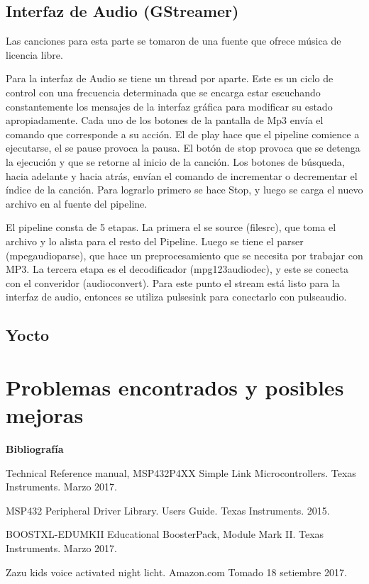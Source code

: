 \subsection{Interfaz de Audio (GStreamer)}
\label{sec:gstramer}
Las canciones para esta parte se tomaron de una fuente que ofrece música de licencia libre. %


Para la interfaz de Audio se tiene un thread por aparte. Este es un ciclo de control con una
frecuencia determinada que se encarga estar escuchando constantemente los mensajes de la interfaz
gráfica para modificar su estado apropiadamente. Cada uno de los botones de la pantalla de Mp3 envía
el comando que corresponde a su acción. El de play hace que el pipeline comience a ejecutarse, el se
pause provoca la pausa. El botón de stop provoca que se detenga la ejecución y que se retorne al
inicio de la canción. Los botones de búsqueda, hacia adelante y hacia atrás, envían el comando de
incrementar o decrementar el índice de la canción. Para lograrlo primero se hace Stop, y luego se
carga el nuevo archivo en al fuente del pipeline. 

El pipeline consta de 5 etapas. La primera el se source (filesrc), que toma el archivo y lo alista
para el resto del Pipeline. Luego se tiene el parser (mpegaudioparse), que hace un preprocesamiento
que se necesita por trabajar con MP3. La tercera etapa es el decodificador (mpg123audiodec), y este
se conecta con el converidor (audioconvert). Para este punto el stream está listo para la interfaz
de audio, entonces se utiliza pulsesink para conectarlo con pulseaudio. 


\subsection{Yocto}
\label{sec:yocto}


\section{Problemas encontrados y posibles mejoras}
\label{sec:possible_fixes}



%


\textbf{ Bibliografía}

Technical Reference manual, MSP432P4XX Simple Link Microcontrollers. Texas Instruments. Marzo 2017.

MSP432 Peripheral Driver Library. Users Guide. Texas Instruments. 2015.

BOOSTXL-EDUMKII Educational BoosterPack, Module Mark II. Texas Instruments. Marzo 2017.

Zazu kids voice activated night licht. Amazon.com Tomado 18 setiembre 2017.

%
%
